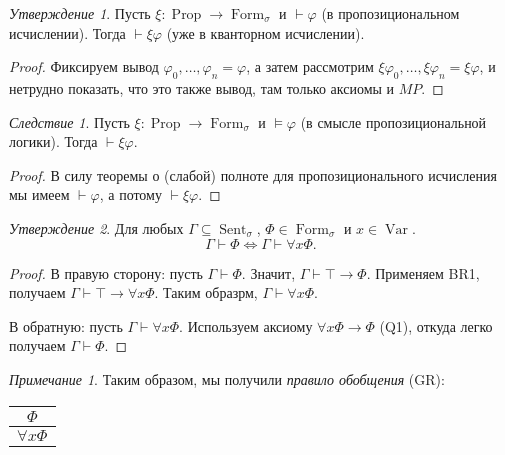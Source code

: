 \documentclass[a4paper,100pt]{article}
\theoremstyle{indented}
\theoremstyle{definition}
\theoremstyle{remark}
\newtheorem{remark}{Примечание}
\newtheorem{cons}{Следствие}
\newtheorem{stat}{Утверждение}
\DeclareMathOperator{\ra}{\rightarrow}
\DeclareMathOperator{\Prop}{Prop}
\DeclareMathOperator{\form}{Form}
\DeclareMathOperator{\Var}{Var}
\DeclareMathOperator{\Sent}{Sent}
\begin{document}
\begin{stat}
  Пусть $\xi: \Prop \ra \form_\sigma$ и $\vdash \varphi$ (в пропозициональном исчислении). Тогда $\vdash \xi\varphi$ (уже в кванторном исчислении).
\end{stat}

\begin{proof}
  Фиксируем вывод $\varphi_0, \ldots, \varphi_n = \varphi$, а затем рассмотрим $\xi\varphi_0, \ldots, \xi\varphi_n = \xi\varphi$, и нетрудно показать, что это также вывод, там только аксиомы и $MP$. 
\end{proof}

\begin{cons}
  Пусть $\xi: \Prop \ra \form_\sigma$ и $\vDash \varphi$ (в смысле пропозициональной логики). Тогда $\vdash \xi \varphi$. 
\end{cons}

\begin{proof}
  В силу теоремы о (слабой) полноте для пропозиционального исчисления мы имеем $\vdash \varphi$, а потому $\vdash \xi \varphi$. 
\end{proof}

\begin{stat}
  Для любых $\Gamma \subseteq \Sent_\sigma$, $\Phi \in \form_\sigma$ и $x\in \Var$. 
  \[
    \Gamma \vdash \Phi \Longleftrightarrow \Gamma \vdash \forall x \Phi. 
  \]
\end{stat}

\begin{proof}
  В правую сторону: пусть $\Gamma \vdash \Phi$. Значит, $\Gamma \vdash \top \ra \Phi$. Применяем BR1, получаем $\Gamma \vdash \top \ra \forall x \Phi$. Таким образрм, $\Gamma \vdash \forall x \Phi$. \ 

  В обратную: пусть $\Gamma \vdash \forall x \Phi$. Используем аксиому $\forall x \Phi \ra \Phi$ (Q1), откуда легко получаем $\Gamma \vdash \Phi$. 
\end{proof}

\begin{remark}
  Таким образом, мы получили \textit{правило обобщения} (GR):

  \begin{center}
    \begin{tabular}{c}
      $\Phi$ \\ 
      \hline
      $\forall x \Phi$ 
    \end{tabular}
  \end{center}
\end{remark}
\end{document}
